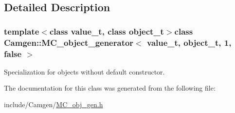\subsection{Detailed Description}
\subsubsection*{template$<$class value\-\_\-t, class object\-\_\-t$>$class Camgen\-::\-M\-C\-\_\-object\-\_\-generator$<$ value\-\_\-t, object\-\_\-t, 1, false $>$}

Specialization for objects without default constructor. 

The documentation for this class was generated from the following file\-:\begin{DoxyCompactItemize}
\item 
include/\-Camgen/\hyperlink{a00673}{M\-C\-\_\-obj\-\_\-gen.\-h}\end{DoxyCompactItemize}

